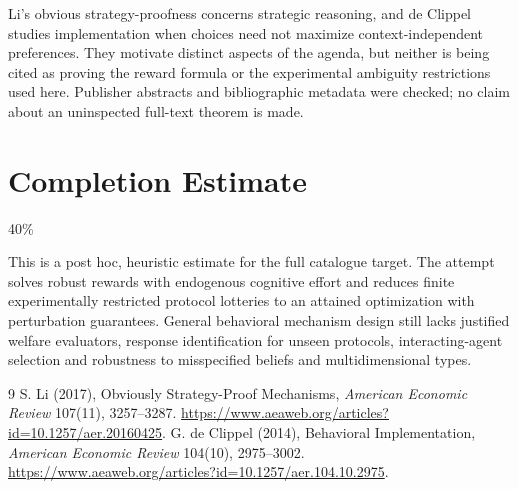 \documentclass[11pt]{article}
\theoremstyle{remark}\newtheorem{remark}[theorem]{Remark}
\begin{document}
Li's obvious strategy-proofness concerns strategic reasoning, and de Clippel studies implementation when choices need not maximize context-independent preferences. They motivate distinct aspects of the agenda, but neither is being cited as proving the reward formula or the experimental ambiguity restrictions used here. Publisher abstracts and bibliographic metadata were checked; no claim about an uninspected full-text theorem is made.

\section{Completion Estimate}
40\%

This is a post hoc, heuristic estimate for the full catalogue target.
The attempt solves robust rewards with endogenous cognitive effort and reduces finite experimentally restricted protocol lotteries to an attained optimization with perturbation guarantees. General behavioral mechanism design still lacks justified welfare evaluators, response identification for unseen protocols, interacting-agent selection and robustness to misspecified beliefs and multidimensional types.

\begin{thebibliography}{9}
 S. Li (2017), Obviously Strategy-Proof Mechanisms, \emph{American Economic Review} 107(11), 3257--3287. \url{https://www.aeaweb.org/articles?id=10.1257/aer.20160425}.
 G. de Clippel (2014), Behavioral Implementation, \emph{American Economic Review} 104(10), 2975--3002. \url{https://www.aeaweb.org/articles?id=10.1257/aer.104.10.2975}.
\end{thebibliography}
\end{document}
